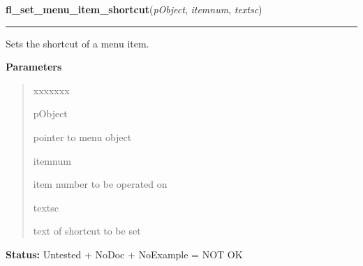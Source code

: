 \hspace{.8\funcindent}\begin{boxedminipage}{\funcwidth}

    \raggedright \textbf{fl\_set\_menu\_item\_shortcut}(\textit{pObject}, \textit{itemnum}, \textit{textsc})

    \vspace{-1.5ex}

    \rule{\textwidth}{0.5\fboxrule}
\setlength{\parskip}{2ex}
    Sets the shortcut of a menu item.

\setlength{\parskip}{1ex}
      \textbf{Parameters}
      \vspace{-1ex}

      \begin{quote}
        \begin{Ventry}{xxxxxxx}

          \item[pObject]

          pointer to menu object

          \item[itemnum]

          item number to be operated on

          \item[textsc]

          text of shortcut to be set

        \end{Ventry}

      \end{quote}

\textbf{Status:} Untested + NoDoc + NoExample = NOT OK



    \end{boxedminipage}

    \label{xformslib:library:fl_set_menu_item_mode}

    \vspace{0.5ex}

